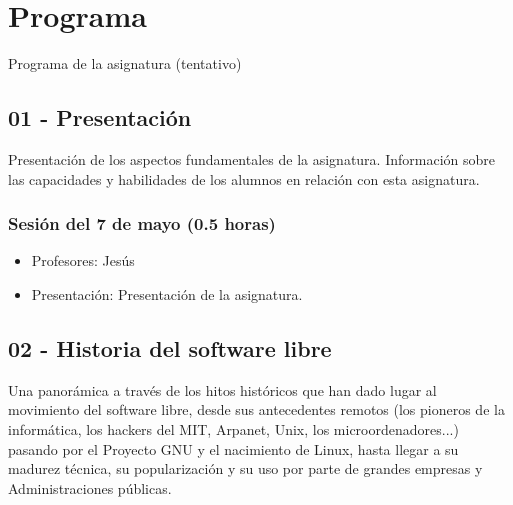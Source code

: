 \documentclass[a4paper,12pt]{article}
\begin{document}
\section{Programa}

Programa de la asignatura (tentativo)

\subsection{01 - Presentación}

Presentación de los aspectos fundamentales de la asignatura. Información sobre las capacidades y habilidades de los alumnos en relación con esta asignatura.

\subsubsection{Sesión del 7 de mayo (0.5 horas)}

\begin{itemize}
\item Profesores: Jesús
\item Presentación: Presentación de la asignatura.
\end{itemize}

\subsection{02 - Historia del software libre}

Una panorámica a través de los hitos históricos que han dado lugar al movimiento del software libre, desde sus antecedentes remotos (los pioneros de la informática, los hackers del MIT, Arpanet, Unix, los microordenadores...) pasando por el Proyecto GNU y el nacimiento de Linux, hasta llegar a su madurez técnica, su popularización y su uso por parte de grandes empresas y Administraciones públicas. 

\end{document}
